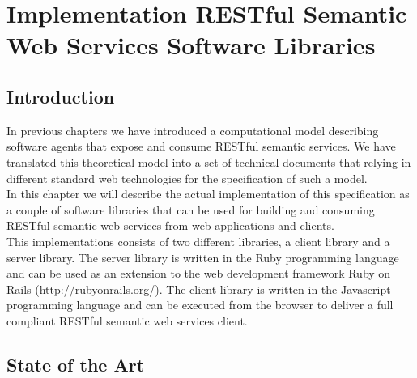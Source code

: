 \chapter{Implementation RESTful Semantic Web Services Software Libraries}\label{capituloIL}

\section{Introduction}

In previous chapters we have introduced a computational model describing software agents that expose and consume RESTful
semantic services. We have translated this theoretical model into a set of technical documents that relying in different
standard web technologies for the specification of such a model.\\
In this chapter we will describe the actual implementation of this specification as a couple of software libraries that
can be used for building and consuming RESTful semantic web services from web applications and clients.\\
This implementations consists of two different libraries, a client library and a server library. The server library is
written in the Ruby programming language and can be used as an extension to the web development framework Ruby on
Rails (\url{http://rubyonrails.org/}). The  client library is written in the Javascript programming language and can be executed from the browser to
deliver a full compliant RESTful semantic web services client.

\section{State of the Art}

